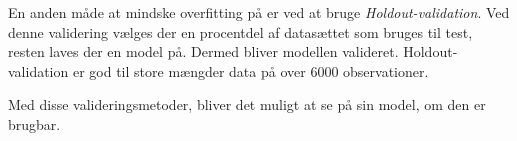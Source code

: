 
En anden måde at mindske overfitting på er ved at bruge \textit{Holdout-validation}. Ved denne validering vælges der en procentdel af datasættet som bruges til test, resten laves der en model på. Dermed bliver modellen valideret. Holdout-validation er god til store mængder data på over 6000 observationer.

Med disse valideringsmetoder, bliver det muligt at se på sin model, om den er brugbar.










